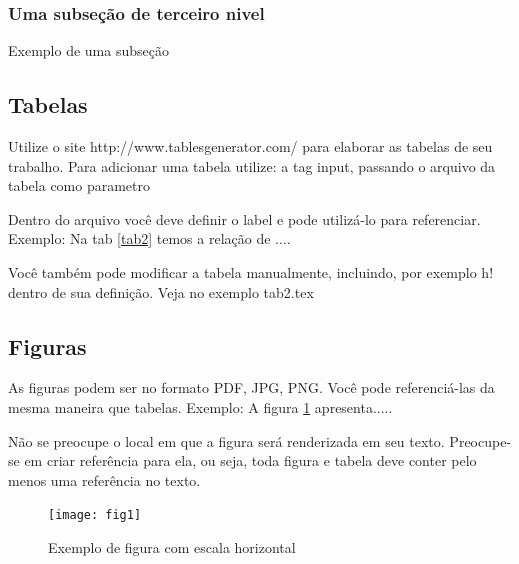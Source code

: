 \documentclass[	DIV=calc,%
							paper=a4,%
							fontsize=12pt,%
							onecolumn]{scrartcl}	 					%
\begin{document}
\subsubsection{Uma subseção de terceiro nivel}

Exemplo de uma subseção

\subsection{Tabelas}

Utilize o site http://www.tablesgenerator.com/ para elaborar as tabelas de seu trabalho.
Para adicionar uma tabela utilize: a tag input, passando o arquivo da tabela como parametro



Dentro do arquivo você deve definir o label e pode utilizá-lo para referenciar. Exemplo:
Na tab \ref{tab2} temos a relação de ....


Você também pode modificar a tabela manualmente, incluindo, por exemplo h! dentro de sua definição. Veja no exemplo tab2.tex

\subsection{Figuras}

As figuras podem ser no formato PDF, JPG, PNG. Você pode referenciá-las da mesma maneira que tabelas. Exemplo: A figura \ref{fig1} apresenta.....

Não se preocupe o local em que a figura será renderizada em seu texto. Preocupe-se em criar referência para ela, ou seja, toda figura e tabela deve conter pelo menos uma referência no texto.

\begin{figure}
\centering
\texttt{[image: fig1]}
\caption{Exemplo de figura com escala horizontal}
\label{fig1}
\end{figure}
\end{document}
